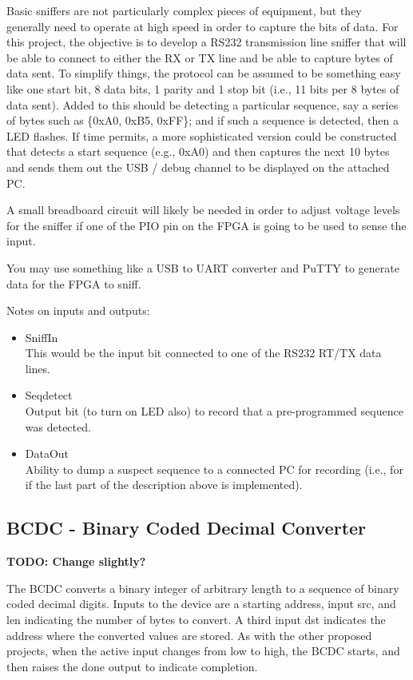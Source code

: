 Basic sniffers are not particularly complex pieces of equipment, but they generally need to operate at high speed in order to capture the bits of data. For this project, the objective is to develop a RS232 transmission line sniffer that will be able to connect to either the RX or TX line and be able to capture bytes of data sent. To simplify things, the protocol can be assumed to be something easy like one start bit, 8 data bits, 1 parity and 1 stop bit (i.e., 11 bits per 8 bytes of data sent). Added to this should be detecting a particular sequence, say a series of bytes such as \{0xA0, 0xB5, 0xFF\}; and if such a sequence is detected, then a LED flashes. If time permits, a more sophisticated version could be constructed that detects a start sequence (e.g., 0xA0) and then captures the next 10 bytes and sends them out the USB / debug channel to be displayed on the attached PC.

A small breadboard circuit will likely be needed in order to adjust voltage levels for the sniffer if one of the PIO pin on the FPGA is going to be used to sense the input.

You may use something like a USB to UART converter and PuTTY to generate data for the FPGA to sniff.

Notes on inputs and outputs:
\begin{itemize}
    \item SniffIn\\
    This would be the input bit connected to one of the RS232 RT/TX data lines.
    \item Seqdetect\\
    Output bit (to turn on LED also) to record that a pre-programmed sequence was detected.
    \item DataOut\\ 
    Ability to dump a suspect sequence to a connected PC for recording (i.e., for if the last part of the description above is implemented).
\end{itemize}


\subsection{BCDC - Binary Coded Decimal Converter}
\textbf{TODO: Change slightly?}

The BCDC converts a binary integer of arbitrary length to a sequence of binary coded decimal digits. Inputs to the device are a starting address, input src, and len indicating the number of bytes to convert. A third input dst indicates the address where the converted values are stored. As with the other proposed projects, when the active input changes from low to high, the BCDC starts, and then raises the done output to indicate completion.

